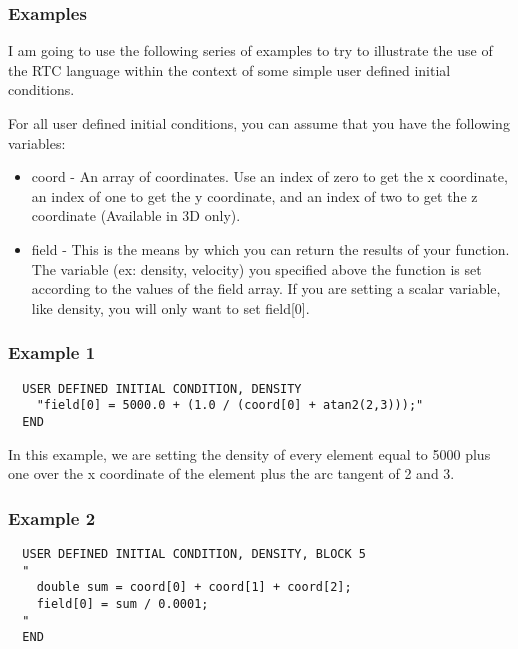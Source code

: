 \subsubsection{Examples}

I am going to use the following series of examples to try to illustrate the
use of the RTC language within the context of some simple user defined initial
conditions.

\noindent For all user defined initial conditions, you can assume that you have
the following variables:

\begin{itemize}
  \item coord - An array of coordinates. Use an index of zero to get the x
                coordinate, an index of one to get the y coordinate, and an
                index of two to get the z coordinate (Available in 3D only).
  \item field - This is the means by which you can return the results of your
                function. The variable (ex: density, velocity) you specified
                above the function is set according to the values of the field
                array. If you are setting a scalar variable, like density, you
                will only want to set field[0].
\end{itemize}

\subsubsection*{Example 1}

{\ttfamily \begin{verbatim}
  USER DEFINED INITIAL CONDITION, DENSITY
    "field[0] = 5000.0 + (1.0 / (coord[0] + atan2(2,3)));"
  END
\end{verbatim} }

\noindent In this example, we are setting the density of every element
equal to 5000 plus one over the x coordinate of the element plus the
arc tangent of 2 and 3.

\subsubsection*{Example 2}

{\ttfamily \begin{verbatim}
  USER DEFINED INITIAL CONDITION, DENSITY, BLOCK 5
  "
    double sum = coord[0] + coord[1] + coord[2];
    field[0] = sum / 0.0001;
  "
  END
\end{verbatim} }

